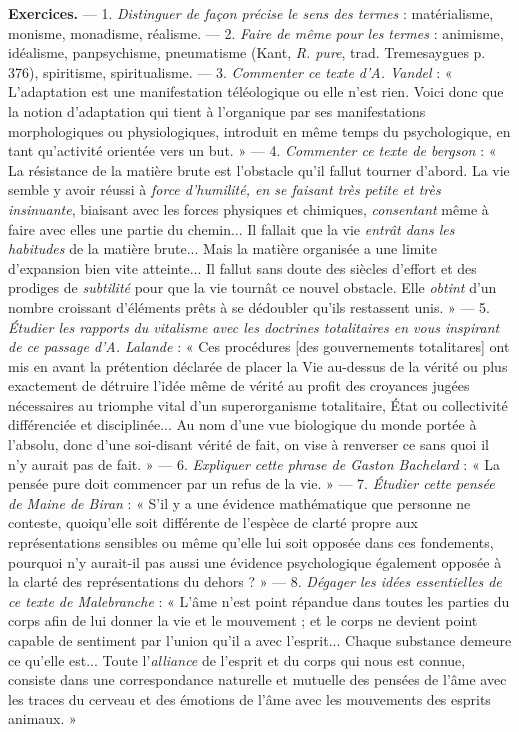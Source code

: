 {\bf Exercices.} — 1. {\it Distinguer de façon précise le sens des termes} : matérialisme,
monisme, monadisme, réalisme. — 2. {\it Faire de même pour les termes} : 
animisme, idéalisme, panpsychisme, pneumatisme (Kant, {\it R. pure}, trad.
Tremesaygues p. 376), spiritisme, spiritualisme. — 3. {\it Commenter ce texte
d'A. Vandel} : « L'adaptation est une manifestation téléologique ou elle n'est
rien. Voici donc que la notion d'adaptation qui tient à l’organique par ses
manifestations morphologiques ou physiologiques, introduit en même temps
du psychologique, en tant qu'activité orientée vers un but. » — 4. {\it Commenter
ce texte de bergson} : « La résistance de la matière brute est l'obstacle
qu'il fallut tourner d'abord. La vie semble y avoir réussi à {\it force d'humilité,
en se faisant très petite et très insinuante}, biaisant avec les forces physiques
et chimiques, {\it consentant} même à faire avec elles une partie du chemin... Il
fallait que la vie {\it entrât dans les habitudes} de la matière brute... Mais la
matière organisée a une limite d'expansion bien vite atteinte... Il fallut
sans doute des siècles d'effort et des prodiges de {\it subtilité} pour que la vie
tournât ce nouvel obstacle. Elle {\it obtint} d'un nombre croissant d'éléments
prêts à se dédoubler qu'ils restassent unis. » — 5. {\it Étudier les rapports du
vitalisme avec les doctrines totalitaires en vous inspirant de ce passage
d'A. Lalande} : « Ces procédures [des gouvernements totalitares] ont mis
en avant la prétention déclarée de placer la Vie au-dessus de la vérité ou
plus exactement de détruire l’idée même de vérité au profit des croyances
jugées nécessaires au triomphe vital d’un superorganisme totalitaire, État
ou collectivité différenciée et disciplinée... Au nom d'une vue biologique du
monde portée à l'absolu, donc d’une soi-disant vérité de fait, on vise à
renverser ce sans quoi il n'y aurait pas de fait. » — 6. {\it Expliquer cette phrase
de Gaston Bachelard} : « La pensée pure doit commencer par un refus de la vie. »
— 7. {\it Étudier cette pensée de Maine de Biran} : « S'il y a une évidence mathématique
que personne ne conteste, quoiqu'elle soit différente de l'espèce de
clarté propre aux représentations sensibles ou même qu'elle lui soit opposée
dans ces fondements, pourquoi n’y aurait-il pas aussi une évidence psychologique
également opposée à la clarté des représentations du dehors ? » —
8. {\it Dégager les idées essentielles de ce texte de Malebranche} : « L'âme n'est
point répandue dans toutes les parties du corps afin de lui donner la vie
et le mouvement ; et le corps ne devient point capable de sentiment par
l'union qu'il a avec l'esprit... Chaque substance demeure ce qu'elle est...
Toute l'{\it alliance} de l'esprit et du corps qui nous est connue, consiste dans une 
correspondance naturelle et mutuelle des pensées de l'âme avec les traces du
cerveau et des émotions de l’âme avec les mouvements des esprits animaux. »

